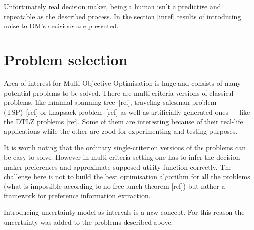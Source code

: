 Unfortunately real decision maker, being a human isn't a predictive and
repeatable as the described process. In the section [inref] results of
introducing noise to DM's decisions are presented.

\section{Problem selection}

Area of interest for Multi-Objective Optimisation is huge and consists of many
potential problems to be solved. There are multi-criteria versions of
classical problems, like minimal spanning tree~[ref], traveling salesman
problem (TSP)~[ref] or knapsack problem~[ref] as well as artificially
generated ones --- like the DTLZ problems [ref]. Some of them are interesting
because of their real-life applications while the other are good for
experimenting and testing purposes.

It is worth noting that the ordinary single-criterion versions of the problems
can be easy to solve. However in multi-criteria setting one has to infer the
decision maker preferences and approximate supposed utility function
correctly. The challenge here is not to build the best optimisation algorithm
for all the problems (what is impossible according to no-free-lunch theorem
[ref]) but rather a framework for preference information extraction.

Introducing uncertainty model as intervals is a new concept. For this reason
the uncertainty was added to the problems described above.

